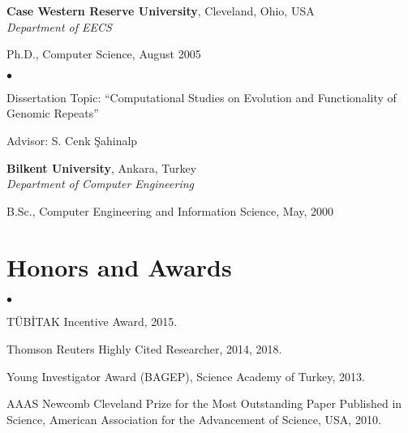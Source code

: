 \documentclass[margin,line]{res}
\newenvironment{list1}{
  \begin{list}{\ding{113}}{%
      \setlength{\itemsep}{0in}
      \setlength{\parsep}{0in} \setlength{\parskip}{0in}
      \setlength{\topsep}{0in} \setlength{\partopsep}{0in} 
      \setlength{\leftmargin}{0.17in}}}{\end{list}}
\newenvironment{list2}{
  \begin{list}{$\bullet$}{%
      \setlength{\itemsep}{0.1cm}
      \setlength{\parsep}{0in} \setlength{\parskip}{0in}
      \setlength{\topsep}{0in} \setlength{\partopsep}{0in} 
      \setlength{\leftmargin}{0.2in}}}{\end{list}}
\newenvironment{list4}{
  \begin{list}{$\bullet$}{%
      \setlength{\itemsep}{0cm}
      \setlength{\parsep}{0in} \setlength{\parskip}{0in}
      \setlength{\topsep}{0in} \setlength{\partopsep}{0in} 
      \setlength{\leftmargin}{0.2in}}}{\end{list}}
\begin{document}
\begin{resume}
    {\bf Case Western Reserve University}, Cleveland, Ohio, USA\\
        {\em Department of EECS} \\
        \vspace*{-.1in}
        \begin{list1}
            \item[] Ph.D., Computer Science, August 2005
            \begin{list2}
                \vspace*{.05in}
                \item Dissertation Topic:  ``Computational Studies on Evolution and Functionality of Genomic Repeats''
                \item Advisor:  S. Cenk \c{S}ahinalp
            \end{list2}
        \end{list1}
          
    {\bf Bilkent University}, Ankara, Turkey \\
        {\em Department of Computer Engineering}\\ 
        \vspace*{-.1in}
        \begin{list1}
            \item[] B.Sc., Computer Engineering and Information Science,  May, 2000
        \end{list1}
                  
\clearpage
          
\vspace*{-.2cm}
    
\section{\sc Honors and Awards} 
    \begin{list4}
        \item TÜBİTAK Incentive Award, 2015.
        \item Thomson Reuters Highly Cited Researcher, 2014, 2018.
        \item Young Investigator Award (BAGEP), Science Academy of Turkey, 2013.
        \item AAAS Newcomb Cleveland Prize for the Most Outstanding Paper Published in Science, American Association for the Advancement of Science, USA, 2010.
    \end{list4}
          

\vspace*{-.2cm}


\end{resume}
\end{document}
